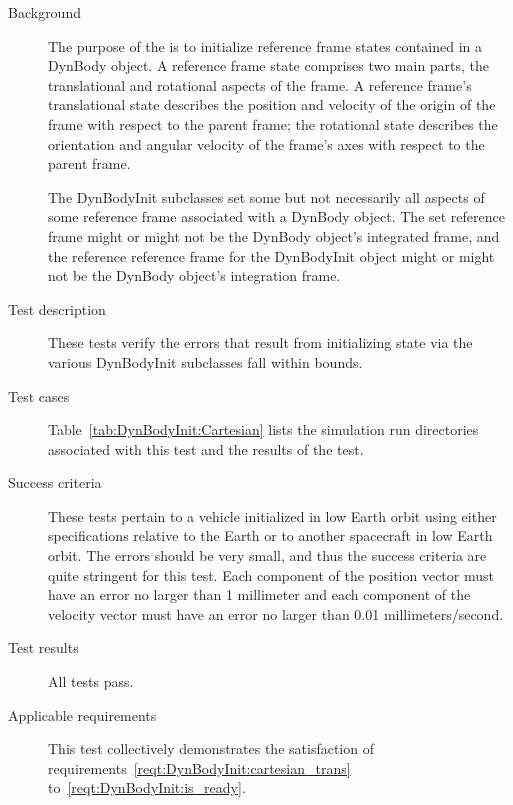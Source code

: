 \newpage
{}
\label{test:DynBodyInit:state_init}
\begin{description}
\item[Background]
The purpose of the \partxname is to initialize
reference frame states contained in a DynBody object.
A reference frame state comprises two main parts, the translational and
rotational aspects of the frame. A reference frame's translational state
describes the position and velocity of the origin of the frame with respect
to the parent frame; the rotational state describes the orientation and
angular velocity of the frame's axes with respect to the parent frame.

The DynBodyInit subclasses set some but not necessarily all aspects of some
reference frame associated with a DynBody object. The set reference frame
might or might not be the DynBody object's integrated frame, and the
reference reference frame for the DynBodyInit object might or might not
be the DynBody object's integration frame.

\item[Test description]
These tests verify the errors that result from initializing state
via the various DynBodyInit subclasses fall within bounds.

\item[Test cases]
Table~\ref{tab:DynBodyInit:Cartesian}
lists the simulation run directories associated with this test
and the results of the test.

\item[Success criteria]
These tests pertain to a vehicle initialized in low Earth orbit
using either specifications relative to the Earth or to another
spacecraft in low Earth orbit. The errors should be very small,
and thus the success criteria are quite stringent for this test.
Each component of the position vector
must have an error no larger than 1 millimeter
and each component of the velocity vector
must have an error no larger than 0.01 millimeters/second.
\item[Test results]
All tests pass.
\item[Applicable requirements]
This test collectively demonstrates the satisfaction of
requirements~\ref{reqt:DynBodyInit:cartesian_trans}
to~\ref{reqt:DynBodyInit:is_ready}.
\end{description}

